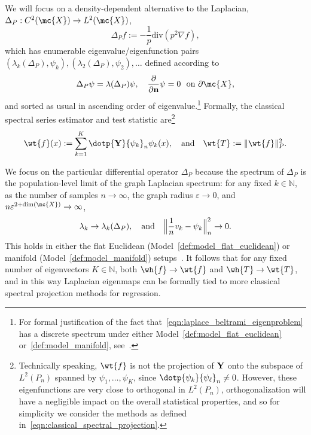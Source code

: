 We will focus on a density-dependent alternative to the Laplacian,  $\Delta_P:C^2(\mc{X}) \to L^2(\mc{X})$,
\begin{equation}
\label{eqn:laplace_beltrami}
\Delta_Pf := -\frac{1}{p} \mathrm{div}(p^2\nabla f),
\end{equation}
which has enumerable eigenvalue/eigenfunction pairs $(\lambda_k(\Delta_P),\psi_k),(\lambda_2(\Delta_P),\psi_2),\ldots$ defined according to
\begin{equation}
\label{eqn:laplace_beltrami_eigenproblem}
\Delta_P\psi = \lambda(\Delta_P) \psi, \quad \frac{\partial}{\partial{\bf n}}\psi = 0~~\textrm{on $\partial \mc{X}$,}
\end{equation}
and sorted as usual in ascending order of eigenvalue.\footnote{For formal justification of the fact that~\eqref{eqn:laplace_beltrami_eigenproblem} has a discrete spectrum under either Model~\ref{def:model_flat_euclidean} or~\ref{def:model_manifold}, see~\cite{garciatrillos18,trillos2019}.} Formally, the classical spectral series estimator and test statistic are\footnote{Technically speaking, $\wt{f}$ is not the projection of ${\bf Y}$ onto the subspace of $L^2(P_n)$ spanned by $\psi_1,\ldots,\psi_K$, since $\dotp{\psi_k}{\psi_{\ell}}_n \neq 0$. However, these eigenfunctions are very close to orthogonal in $L^2(P_n)$, orthogonalization will have a negligible impact on the overall statistical properties, and so for simplicity we consider the methods as defined in~\eqref{eqn:classical_spectral_projection}.}
\begin{equation}
\label{eqn:classical_spectral_projection}
\wt{f}(x) := \sum_{k = 1}^{K} \dotp{{\bf Y}}{\psi_k}_{n} \psi_k(x),\quad\textrm{and}\quad \wt{T} := \|\wt{f}\|_P^2.
\end{equation}

We focus on the particular differential operator $\Delta_P$ because the spectrum of $\Delta_P$ is the population-level limit of the graph Laplacian spectrum: for any fixed $k \in \mathbb{N}$, as the number of samples $n \to \infty$, the graph radius $\varepsilon \to 0$, and $n\varepsilon^{2 + \dim(\mc{X})} \to \infty$,
\begin{equation}
\lambda_k \to \lambda_k(\Delta_P), \quad\textrm{and}\quad \Bigl\|\frac{1}{n}v_k - \psi_k\Bigr\|_n^2 \to 0.
\end{equation}
This holds in either the flat Euclidean (Model~\ref{def:model_flat_euclidean}) or manifold (Model~\ref{def:model_manifold}) setups~\citep{garciatrillos18,trillos2019}. It follows that for any fixed number of eigenvectors $K \in \mathbb{N}$, both $\wh{f} \to \wt{f}$ and $\wh{T} \to \wt{T}$, and in this way Laplacian eigenmaps can be formally tied to more classical spectral projection methods for regression.
 
